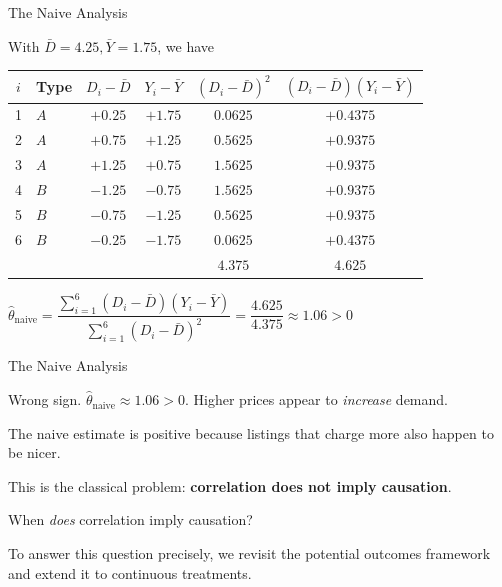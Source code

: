 \documentclass[aspectratio=169, 11pt]{beamer}
\begin{document}
\begin{frame}{The Naive Analysis}

With $\bar{D} = 4.25, \bar{Y} = 1.75$, we have

\begin{center}
\scriptsize
\begin{tabular}{clcccc}
\toprule
$i$ & Type & $D_i - \bar{D}$ & $Y_i - \bar{Y}$ & $(D_i-\bar{D})^2$ & $(D_i-\bar{D})(Y_i-\bar{Y})$ \\
\midrule
1 & $A$ & $+0.25$ & $+1.75$ & $0.0625$ & $+0.4375$ \\
2 & $A$ & $+0.75$ & $+1.25$ & $0.5625$ & $+0.9375$ \\
3 & $A$ & $+1.25$ & $+0.75$ & $1.5625$ & $+0.9375$ \\
4 & $B$ & $-1.25$ & $-0.75$ & $1.5625$ & $+0.9375$ \\
5 & $B$ & $-0.75$ & $-1.25$ & $0.5625$ & $+0.9375$ \\
6 & $B$ & $-0.25$ & $-1.75$ & $0.0625$ & $+0.4375$ \\
\midrule
  &   & & & $4.375$ & $4.625$ \\
\bottomrule
\end{tabular}
\end{center}

$\hat{\theta}_{\text{naive}} = \dfrac{\sum_{i=1}^{6}(D_i - \bar{D})(Y_i - \bar{Y})}{\sum_{i=1}^{6}(D_i - \bar{D})^2} = \dfrac{4.625}{4.375} \approx 1.06 > 0$

\end{frame}


\begin{frame}{The Naive Analysis}

\begin{alertblock}{Wrong sign.}
$\hat{\theta}_{\text{naive}} \approx 1.06 > 0$. Higher prices appear to \emph{increase} demand. 
\end{alertblock}

\bigskip

The naive estimate is positive because listings that charge more also happen to be nicer. 

\bigskip

This is the classical problem: \textbf{correlation does not imply causation}.

\bigskip

When \emph{does} correlation imply causation? 

\bigskip

To answer this question precisely, we revisit the potential outcomes framework and extend it to continuous treatments.

\end{frame}
\end{document}
